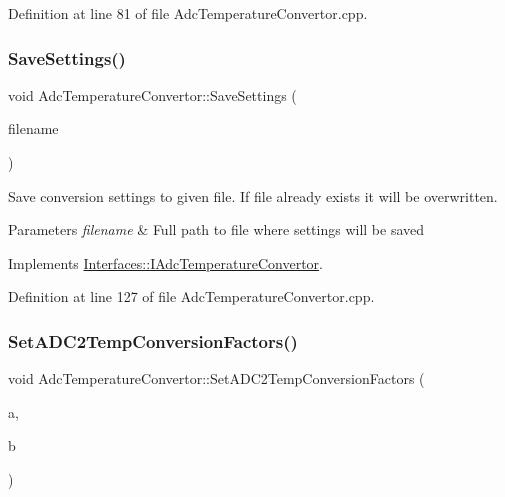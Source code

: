 Definition at line 81 of file Adc\+Temperature\+Convertor.\+cpp.

\mbox{\label{class_adc_temperature_convertor_aa6935469c6bb9e2df9a21495d7e8b72a}} 
\subsubsection{\texorpdfstring{Save\+Settings()}{SaveSettings()}}
{\footnotesize\ttfamily void Adc\+Temperature\+Convertor\+::\+Save\+Settings (\begin{DoxyParamCaption}\item[{Q\+String}]{filename }\end{DoxyParamCaption})\hspace{0.3cm}{\ttfamily [virtual]}}



Save conversion settings to given file. If file already exists it will be overwritten. 


\begin{DoxyParams}{Parameters}
{\em filename} & Full path to file where settings will be saved \\
\hline
\end{DoxyParams}


Implements \hyperlink{class_interfaces_1_1_i_adc_temperature_convertor_a6631e979e067ab78d3e5c337449876ac}{Interfaces\+::\+I\+Adc\+Temperature\+Convertor}.



Definition at line 127 of file Adc\+Temperature\+Convertor.\+cpp.

\mbox{\label{class_adc_temperature_convertor_a4850843e55992608213cc9cf82d36830}} 
\subsubsection{\texorpdfstring{Set\+A\+D\+C2\+Temp\+Conversion\+Factors()}{SetADC2TempConversionFactors()}}
{\footnotesize\ttfamily void Adc\+Temperature\+Convertor\+::\+Set\+A\+D\+C2\+Temp\+Conversion\+Factors (\begin{DoxyParamCaption}\item[{double}]{a,  }\item[{double}]{b }\end{DoxyParamCaption})\hspace{0.3cm}{\ttfamily [virtual]}}



